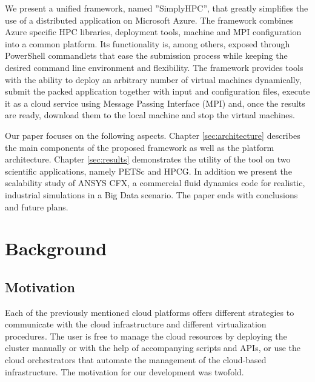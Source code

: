 \documentclass[3p,times]{elsarticle}
\begin{document}
We present a unified framework, named ''SimplyHPC'',  that greatly simplifies the use of a distributed application on Microsoft Azure. The framework combines Azure specific HPC libraries, deployment tools, machine and MPI configuration into a common platform. Its functionality is, among others, exposed through PowerShell commandlets that ease the submission process while keeping the desired command line environment and flexibility. The framework provides tools with the ability to deploy an arbitrary number of virtual machines dynamically, submit the packed application together with input and configuration files, execute it as a cloud service using Message Passing Interface (MPI) and, once the results are ready, download them to the local machine and stop the virtual machines. 

Our paper focuses on the following aspects. Chapter \ref{sec:architecture} describes the main components of the proposed framework as well as the platform architecture. Chapter \ref{sec:results} demonstrates the utility of the tool on two scientific applications, namely PETSc and HPCG. In addition we present the scalability study of ANSYS CFX, a commercial fluid dynamics code for realistic, industrial simulations in a Big Data scenario. The paper ends with conclusions and future plans.

\section{Background}
\label{sec:background}
\subsection{Motivation}
Each of the previously mentioned cloud platforms offers different strategies to communicate with the cloud infrastructure and different virtualization procedures. The user is free to manage the cloud resources by deploying the cluster manually or with the help of accompanying scripts and APIs, or use the cloud orchestrators that automate the management of the cloud-based infrastructure. The motivation for our development was twofold.
\end{document}
